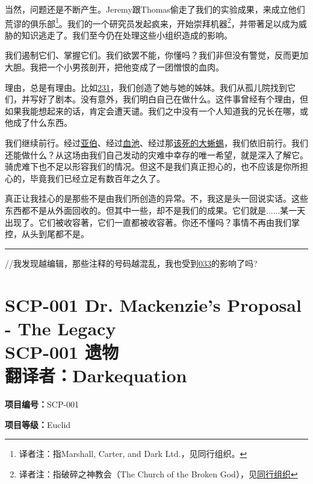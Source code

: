 \documentclass[openany,a4paper]{book} %
\newcounter{mychapter} %
\begin{document}
\begin{colorboxed}
当然，问题还是不断产生。Jeremy跟Thomas偷走了我们的实验成果，来成立他们荒谬的俱乐部\footnote{译者注：指Marshall, Carter, and Dark Ltd.，见同行组织。}。我们的一个研究员发起疯来，开始崇拜机器\footnote{译者注：指破碎之神教会（The Church of the Broken God），见\hyperref[chap:同行组织]{同行组织}}，并带著足以成为威胁的知识逃走了。我们至今仍在处理这些小组织造成的影响。\vspace{12pt}

我们遏制它们、掌握它们。我们欲罢不能，你懂吗？我们非但没有警觉，反而更加大胆。我把一个小男孩剖开，把他变成了一团憎恨的血肉。\vspace{12pt}

理由，总是有理由。比如\hyperref[chap:SCP-231]{231}，我们创造了她与她的姊妹。我们从孤儿院找到它们，并写好了剧本。没有意外，我们明白自己在做什么。这件事曾经有个理由，但如果我能想起来的话，肯定会遭天谴。我们之中没有一个人知道我的兄长在哪，或他成了什么东西。\vspace{12pt}

我们继续前行。经过\hyperref[chap:SCP-076]{亚伯}、经过\hyperref[chap:SCP-354]{血池}、经过那\hyperref[chap:SCP-682]{该死的大蜥蜴}，我们依旧前行。我们还能做什么？从这场由我们自己发动的灾难中幸存的唯一希望，就是深入了解它。骑虎难下也不足以形容我们的情况。但这不是我们真正担心的，也不应该是你所担心的，毕竟我们已经立足有数百年之久了。\vspace{12pt}

真正让我挂心的是那些不是由我们所创造的异常。不，我这是头一回说实话。这些东西都不是从外面回收的。但其中一些，却不是我们的成果。它们就是......某一天出现了。它们被收容著，它们一直都被收容著。你还不懂吗？事情不再由我们掌控，从头到尾都不是。
\end{colorboxed}\vspace{12pt}
\hrule\vspace{12pt}
//我发现越编辑，那些注释的号码越混乱，我也受到\hyperref[chap:SCP-033]{033}的影响了吗?

\addtocounter{mychapter}{1}
\chapter[SCP-001 遗物]{SCP-001 Dr. Mackenzie's Proposal -  The Legacy \\ SCP-001 遗物 \\ 翻译者：Darkequation}\label{chap:SCP-001-7}
\textbf{项目编号：}SCP-001\vspace{12pt}

\textbf{项目等级：}Euclid\vspace{12pt}
\end{document}
